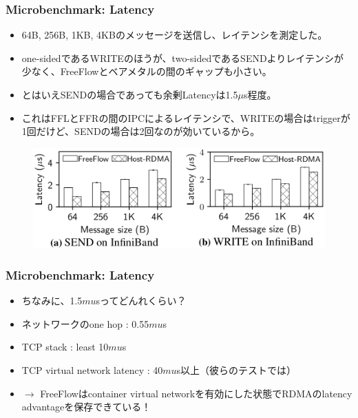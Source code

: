 \documentclass[dvipdfmx,9pt,notheorems]{beamer}
\theoremstyle{definition}
\begin{document}
\begin{frame}\frametitle{Microbenchmark: Latency}
	\begin{itemize}
		\item 64B, 256B, 1KB, 4KBのメッセージを送信し、レイテンシを測定した。
		\item one-sidedであるWRITEのほうが、two-sidedであるSENDよりレイテンシが少なく、FreeFlowとベアメタルの間のギャップも小さい。
		\item とはいえSENDの場合であっても余剰Latencyは1.5$\mu$s程度。
		\item これはFFLとFFRの間のIPCによるレイテンシで、WRITEの場合はtriggerが1回だけど、SENDの場合は2回なのが効いているから。
	\end{itemize}
  \begin{figure}[htb]
    \centering
		\includegraphics[scale=1]{fig/figure10.png}
  \end{figure}
\end{frame}

\begin{frame}\frametitle{Microbenchmark: Latency}
	\begin{itemize}
		\item ちなみに、1.5$mu$sってどんれくらい？
		\item ネットワークのone hop : 0.55$mu$s
		\item TCP stack : least 10$mu$s
		\item TCP virtual network latency : 40$mu$s以上（彼らのテストでは）
		\item $\rightarrow$ {\color{red}FreeFlowはcontainer virtual networkを有効にした状態でRDMAのlatency advantageを保存できている！}
	\end{itemize}
\end{frame}
\end{document}
